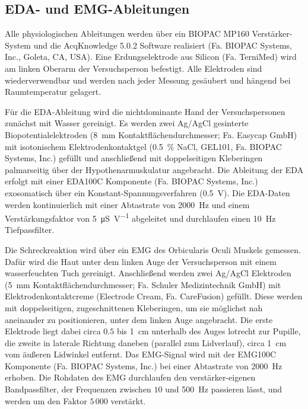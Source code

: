 		\subsection{EDA- und EMG-Ableitungen}\label{physio}
			Alle physiologischen Ableitungen werden über ein BIOPAC MP160 Verstärker-System und die AcqKnowledge 5.0.2
			Software realisiert (Fa. BIOPAC Systems, Inc., Goleta, CA, USA). %
			Eine Erdungselektrode aus Silicon (Fa. TerniMed) wird am linken Oberarm der Versuchsperson befestigt. Alle Elektroden sind wiederverwendbar und werden nach jeder Messung gesäubert und hängend bei Raumtemperatur gelagert. 
			
			Für die EDA-Ableitung wird die nichtdominante Hand der Versuchspersonen zunächst mit Wasser gereinigt. Es werden zwei Ag/AgCl gesinterte Biopotentialelektroden (\SI{8}{\milli\meter} Kontaktflächendurchmesser; Fa. Easycap GmbH) mit isotonischem Elektrodenkontaktgel (\SI{0.5}{\percent} NaCl, GEL101, Fa. BIOPAC Systems, Inc.) gefüllt und anschließend mit doppelseitigen Kleberingen palmarseitig über der Hypothenarmuskulatur angebracht.
			Die Ableitung der EDA erfolgt mit einer EDA100C Komponente (Fa. BIOPAC Systems, Inc.) exosomatisch über ein Konstant-Spannungsverfahren (\SI{0.5}{\volt}). Die EDA-Daten werden kontinuierlich mit einer Abtastrate von \SI[group-minimum-digits = 4]{2000}{\hertz} und einem Verstärkungsfaktor von \SI[per-mode=symbol]{5}{\micro\siemens\per\volt} abgeleitet %
			und durchlaufen einen \SI{10}{\hertz} Tiefpassfilter. %
			
			Die Schreckreaktion wird über ein EMG des Orbicularis Oculi Muskels gemessen. Dafür wird die Haut unter dem linken Auge der Versuchsperson mit einem wasserfeuchten Tuch gereinigt. Anschließend werden zwei Ag/AgCl Elektroden (\SI{5}{\milli\meter} Kontaktflächendurchmesser; Fa. Schuler Medizintechnik GmbH) mit Elektrodenkontaktcreme (Electrode Cream, Fa. CareFusion) gefüllt. Diese werden mit doppelseitigen, zugeschnittenen Kleberingen, um sie möglichst nah aneinander zu positionieren, unter dem linken Auge angebracht. Die erste Elektrode liegt dabei circa $0.5$ bis \SI{1}{\centi\meter} unterhalb des Auges lotrecht zur Pupille, die zweite in laterale Richtung daneben (parallel zum Lidverlauf), circa \SI{1}{\centi\meter} vom äußeren Lidwinkel entfernt. 
			Das EMG-Signal wird mit der EMG100C Komponente (Fa. BIOPAC Systems, Inc.) bei einer Abtastrate von \SI[group-minimum-digits = 4]{2000}{\hertz} erhoben. Die Rohdaten des EMG durchlaufen den verstärker-eigenen Bandpassfilter, der Frequenzen zwischen $10$ und \SI{500}{\hertz} passieren lässt, %
			und werden um den Faktor $5\,000$ verstärkt. %
	
